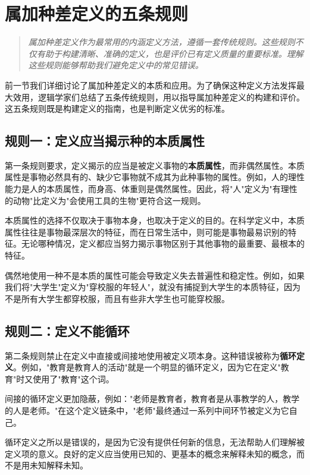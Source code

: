 \section{属加种差定义的五条规则}

\begin{quotation}
\textit{属加种差定义作为最常用的内涵定义方法，遵循一套传统规则。这些规则不仅有助于构建清晰、准确的定义，也是评价已有定义质量的重要标准。理解这些规则能够帮助我们避免定义中的常见错误。}
\end{quotation}

前一节我们详细讨论了属加种差定义的本质和应用。为了确保这种定义方法发挥最大效用，逻辑学家们总结了五条传统规则，用以指导属加种差定义的构建和评价。这五条规则既是构建定义的指南，也是判断定义优劣的标准。

\subsection{规则一：定义应当揭示种的本质属性}

第一条规则要求，定义揭示的应当是被定义事物的\textbf{本质属性}，而非偶然属性。本质属性是事物必然具有的、缺少它事物就不成其为此种事物的属性。例如，人的理性能力是人的本质属性，而身高、体重则是偶然属性。因此，将"人"定义为"有理性的动物"比定义为"会使用工具的生物"更符合这一规则。

本质属性的选择不仅取决于事物本身，也取决于定义的目的。在科学定义中，本质属性往往是事物最深层次的特征，而在日常生活中，则可能是事物最易识别的特征。无论哪种情况，定义都应当努力揭示事物区别于其他事物的最重要、最根本的特征。

偶然地使用一种不是本质的属性可能会导致定义失去普遍性和稳定性。例如，如果我们将"大学生"定义为"穿校服的年轻人"，就没有捕捉到大学生的本质特征，因为不是所有大学生都穿校服，而且有些非大学生也可能穿校服。

\subsection{规则二：定义不能循环}

第二条规则禁止在定义中直接或间接地使用被定义项本身。这种错误被称为\textbf{循环定义}。例如，"教育是教育人的活动"就是一个明显的循环定义，因为它在定义"教育"时又使用了"教育"这个词。

间接的循环定义更加隐蔽，例如："老师是教育者，教育者是从事教学的人，教学的人是老师。"在这个定义链条中，"老师"最终通过一系列中间环节被定义为它自己。

循环定义之所以是错误的，是因为它没有提供任何新的信息，无法帮助人们理解被定义项的意义。良好的定义应当使用已知的、更基本的概念来解释未知的概念，而不是用未知解释未知。

